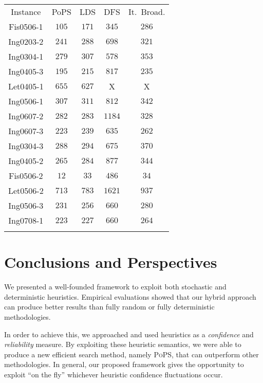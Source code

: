 \documentclass{ws-ijait}
\begin{document}
\begin{table}
  {\begin{tabular}{ccccc}
    \toprule
                         Instance & PoPS & LDS & DFS & It.\ Broad. \\
    \colrule
    \textsf{Fis0506-1} & $\mathit{105}$ & $171$ &  $345$ & $286$ \\
    \textsf{Ing0203-2} & $\mathit{241}$ & $288$ &  $698$ & $321$ \\
    \textsf{Ing0304-1} & $\mathit{279}$ & $307$ &  $578$ & $353$ \\
    \textsf{Ing0405-3} & $\mathit{195}$ & $215$ &  $817$ & $235$ \\
    \textsf{Let0405-1} & $655$ & $\mathit{627}$ &    X   &   X   \\
    \textsf{Ing0506-1} & $\mathit{307}$ & $311$ &  $812$ & $342$ \\
    \textsf{Ing0607-2} & $\mathit{282}$ & $283$ & $1184$ & $328$ \\
    \textsf{Ing0607-3} & $\mathit{223}$ & $239$ &  $635$ & $262$ \\
    \textsf{Ing0304-3} & $\mathit{288}$ & $294$ &  $675$ & $370$ \\
    \textsf{Ing0405-2} & $\mathit{265}$ & $284$ &  $877$ & $344$ \\
    \textsf{Fis0506-2} &  $\mathit{12}$ &  $33$ &  $486$ &  $34$ \\
    \textsf{Let0506-2} & $\mathit{713}$ & $783$ & $1621$ & $937$ \\
    \textsf{Ing0506-3} & $\mathit{231}$ & $256$ &  $660$ & $280$ \\
    \textsf{Ing0708-1} & $\mathit{223}$ & $227$ &  $660$ & $264$ \\
    \botrule
  \end{tabular}}
\end{table}


\section{Conclusions and Perspectives}

We presented a well-founded framework to exploit both
stochastic and deterministic heuristics. Empirical
evaluations showed that our hybrid approach can produce
better results than fully random or fully deterministic
methodologies.

In order to achieve this, we approached and used heuristics
as a \emph{confidence} and \emph{reliability} measure. By
exploiting these heuristic semantics, we were able to
produce a new efficient search method, namely \textsc{PoPS},
that can outperform other methodologies. In general, our
proposed framework gives the opportunity to exploit ``on the
fly'' whichever heuristic confidence fluctuations occur.
\end{document}

